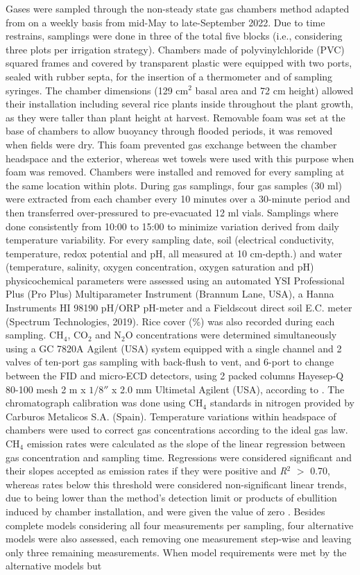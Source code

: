 Gases were sampled through the non-steady state gas chambers method adapted from \cite{martinez-eixarch2018} on a weekly basis from mid-May to late-September 2022. Due to time restrains, samplings were done in three of the total five blocks (i.e., considering three plots per irrigation strategy). Chambers made of polyvinylchloride (PVC) squared frames and covered by transparent plastic were equipped with two ports, sealed with rubber septa, for the insertion of a thermometer and of sampling syringes. The chamber dimensions (129 cm$^{2}$ basal area and 72 cm height) allowed  their installation including several rice plants inside throughout the plant growth, as they were taller than plant height at harvest. Removable foam was set at the base of chambers to allow buoyancy through flooded periods, it was removed when fields were dry. This foam prevented gas exchange between the chamber headspace and the exterior, whereas wet towels were used with this purpose when foam was removed. Chambers were installed and removed for every sampling at the same location within plots. During gas samplings, four gas samples (30 ml) were extracted from each chamber every 10 minutes over a 30-minute period and then transferred over-pressured to pre-evacuated 12 ml vials. Samplings where done consistently from 10:00 to 15:00 to minimize variation derived from daily temperature variability. For every sampling date, soil (electrical conductivity, temperature, redox potential and pH, all measured at 10 cm-depth.) and water (temperature, salinity, oxygen concentration, oxygen saturation and pH) physicochemical parameters were assessed using an automated YSI Professional Plus (Pro Plus) Multiparameter Instrument (Brannum Lane, USA), a Hanna Instruments HI 98190 pH/ORP pH-meter and a Fieldscout direct soil E.C. meter (Spectrum Technologies, 2019). Rice cover (\%) was also recorded during each sampling. CH$_{4}$, CO$_{2}$ and N$_{2}$O concentrations were determined simultaneously using a GC 7820A Agilent (USA) system equipped with a single channel and 2 valves of ten-port gas sampling with back-flush to vent, and 6-port to change between the FID and micro-ECD detectors, using 2 packed columns Hayesep-Q 80-100 mesh 2 m x $1/8''$ x 2.0 mm Ultimetal Agilent (USA), according to \cite{arias2025determination}. The chromatograph calibration was done using CH$_{4}$ standards in nitrogen provided by Carburos Metalicos S.A. (Spain). Temperature variations within headspace of chambers were used to correct gas concentrations according to the ideal gas law. CH$_{4}$ emission rates were calculated as the slope of the linear regression between gas concentration and sampling time. Regressions were considered significant and their slopes accepted as emission rates if they were positive and \textit{R}$^2$ $>$ 0.70, whereas rates below this threshold were considered non-significant linear trends, due to being lower than the method's detection limit or products of ebullition induced by chamber installation, and were given the value of zero \citep{schultz2023}. Besides complete models considering all four measurements per sampling, four alternative models were also assessed, each removing one measurement step-wise and leaving only three remaining measurements. When model requirements were met by the alternative models but 